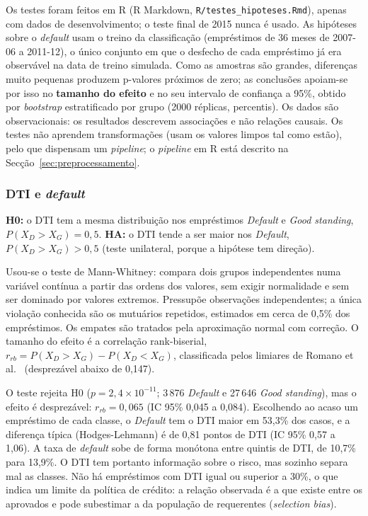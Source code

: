 Os testes foram feitos em R (R Markdown, \texttt{R/testes\_hipoteses.Rmd}), apenas com dados de
desenvolvimento; o teste final de 2015 nunca é usado. As hipóteses sobre o \textit{default}
usam o treino da classificação (empréstimos de 36 meses de 2007-06 a 2011-12), o único conjunto
em que o desfecho de cada empréstimo já era observável na data de treino simulada. Como as
amostras são grandes, diferenças muito pequenas produzem p-valores próximos de zero; as
conclusões apoiam-se por isso no \textbf{tamanho do efeito} e no seu intervalo de confiança a
95\%, obtido por \textit{bootstrap} estratificado por grupo (2000 réplicas, percentis). Os dados
são observacionais: os resultados descrevem associações e não relações causais. Os testes não
aprendem transformações (usam os valores limpos tal como estão), pelo que dispensam um
\textit{pipeline}; o \textit{pipeline} em R está descrito na
Secção~\ref{sec:preprocessamento}.


\subsubsection{DTI e \textit{default}}

\textbf{H0:} o DTI tem a mesma distribuição nos empréstimos \textit{Default} e
\textit{Good standing}, $P(X_{D} > X_{G}) = 0{,}5$. \textbf{HA:} o DTI tende a ser maior nos
\textit{Default}, $P(X_{D} > X_{G}) > 0{,}5$ (teste unilateral, porque a hipótese tem direção).

Usou-se o teste de Mann-Whitney: compara dois grupos independentes numa variável contínua a
partir das ordens dos valores, sem exigir normalidade e sem ser dominado por valores extremos.
Pressupõe observações independentes; a única violação conhecida são os mutuários repetidos,
estimados em cerca de 0,5\% dos empréstimos. Os empates são tratados pela aproximação normal
com correção. O tamanho do efeito é a correlação rank-biserial,
$r_{rb} = P(X_D > X_G) - P(X_D < X_G)$, classificada pelos limiares de Romano et al.~\cite{romano}
(desprezável abaixo de 0,147).

O teste rejeita H0 ($p = 2{,}4 \times 10^{-11}$; 3\,876 \textit{Default} e 27\,646
\textit{Good standing}), mas o efeito é desprezável: $r_{rb} = 0{,}065$ (IC 95\% 0,045 a
0,084). Escolhendo ao acaso um empréstimo de cada classe, o \textit{Default} tem o DTI maior em
53,3\% dos casos, e a diferença típica (Hodges-Lehmann) é de 0,81 pontos de DTI (IC 95\% 0,57 a
1,06). A taxa de \textit{default} sobe de forma monótona entre quintis de DTI, de 10,7\% para
13,9\%. O DTI tem portanto informação sobre o risco, mas sozinho separa mal as classes. Não há
empréstimos com DTI igual ou superior a 30\%, o que indica um limite da política de crédito: a
relação observada é a que existe entre os aprovados e pode subestimar a da população de
requerentes (\textit{selection bias}).

